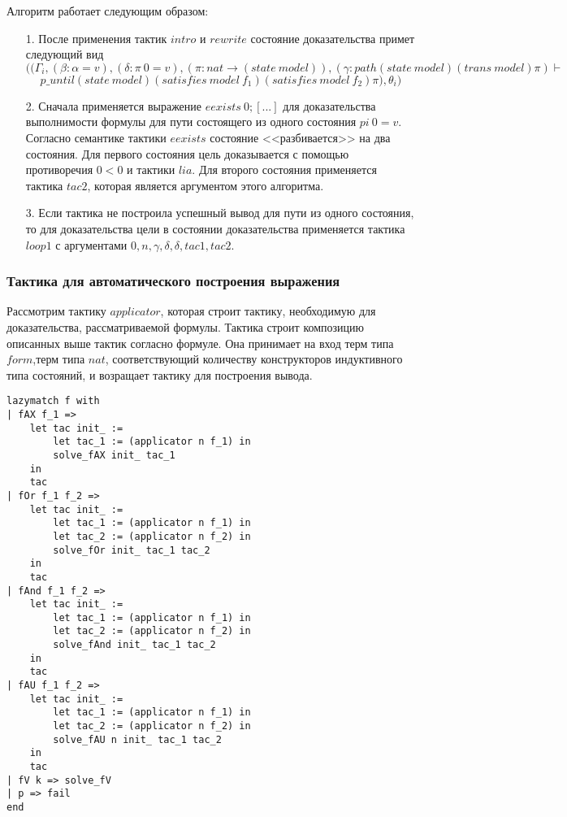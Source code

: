 \documentclass[12pt]{article}
\begin{document}
Алгоритм работает следующим образом:
\begin{enumerate}
    \item[1.] После применения тактик $intro$ и $rewrite$ состояние доказательства примет следующий вид
    $$((\Gamma_i, (\beta:\alpha = v),(\delta: \pi\ 0 = v), (\pi: nat \xrightarrow{} (state\ model)),(\gamma: path (state\ model) (trans\ model) \pi) \vdash $$
    $$ p\_until (state\ model) (satisfies\ model\ f_1) (satisfies\ model\ f_2) \pi), \theta_i)$$
    \item[2.] Сначала применяется выражение $eexists\ 0;[...]$ для доказательства выполнимости формулы для пути состоящего из одного состояния $pi\ 0 = v$. Согласно семантике тактики $eexists$ состояние <<разбивается>> на два состояния. Для первого состояния цель доказывается с помощью противоречия $0<0$ и тактики $lia$. Для второго состояния применяется тактика $tac2$, которая является аргументом этого алгоритма.
    \item[3.] Если тактика не построила успешный вывод для пути из одного состояния, то для доказательства цели в состоянии доказательства применяется тактика $loop1$ с аргументами $0, n, \gamma,\delta, \delta, tac1, tac2$.
\end{enumerate}


\subsubsection{Тактика для автоматического построения выражения}
Рассмотрим тактику $applicator$, которая строит тактику, необходимую для доказательства, рассматриваемой формулы. Тактика строит композицию описанных выше тактик согласно формуле. Она принимает на вход терм типа $form$,терм типа $nat$, соответствующий количеству конструкторов индуктивного типа состояний, и возращает тактику для построения вывода.
\begin{verbatim}
lazymatch f with
| fAX f_1 => 
    let tac init_ := 
        let tac_1 := (applicator n f_1) in 
        solve_fAX init_ tac_1
    in
    tac
| fOr f_1 f_2 => 
    let tac init_ := 
        let tac_1 := (applicator n f_1) in
        let tac_2 := (applicator n f_2) in 
        solve_fOr init_ tac_1 tac_2
    in 
    tac
| fAnd f_1 f_2 => 
    let tac init_ := 
        let tac_1 := (applicator n f_1) in
        let tac_2 := (applicator n f_2) in 
        solve_fAnd init_ tac_1 tac_2    
    in 
    tac
| fAU f_1 f_2 => 
    let tac init_ := 
        let tac_1 := (applicator n f_1) in
        let tac_2 := (applicator n f_2) in 
        solve_fAU n init_ tac_1 tac_2
    in 
    tac
| fV k => solve_fV
| p => fail
end
\end{verbatim}
\end{document}
